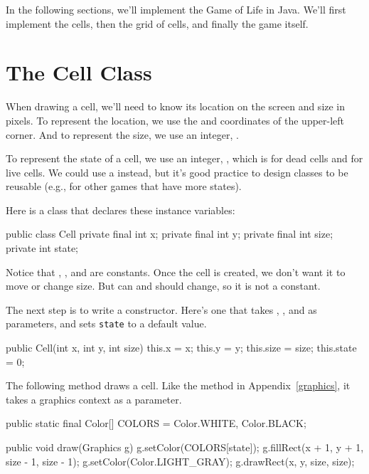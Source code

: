 In the following sections, we'll implement the Game of Life in Java.
We'll first implement the cells, then the grid of cells, and finally the game itself.


\section{The Cell Class}

When drawing a cell, we'll need to know its location on the screen and size in pixels.
To represent the location, we use the  and  coordinates of the upper-left corner.
And to represent the size, we use an integer, .

To represent the state of a cell, we use an integer, , which is  for dead cells and  for live cells.
We could use a  instead, but it's good practice to design classes to be reusable (e.g., for other games that have more states).

Here is a  class that declares these instance variables:

\begin{code}
public class Cell {
    private final int x;
    private final int y;
    private final int size;
    private int state;
}
\end{code}

Notice that , , and  are constants.
Once the cell is created, we don't want it to move or change size.
But  can and should change, so it is not a constant.

The next step is to write a constructor.
Here's one that takes , , and  as parameters, and sets {\tt state} to a default value.

\begin{code}
public Cell(int x, int y, int size) {
    this.x = x;
    this.y = y;
    this.size = size;
    this.state = 0;
}
\end{code}

%

The following method draws a cell.
Like the  method in Appendix~\ref{graphics}, it takes a graphics context as a parameter.

\begin{code}
public static final Color[] COLORS = {Color.WHITE, Color.BLACK};

public void draw(Graphics g) {
    g.setColor(COLORS[state]);
    g.fillRect(x + 1, y + 1, size - 1, size - 1);
    g.setColor(Color.LIGHT_GRAY);
    g.drawRect(x, y, size, size);
}
\end{code}

